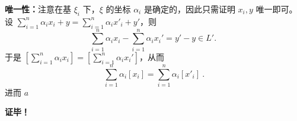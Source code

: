 \textbf{唯一性：}注意在基 $\xi_i$ 下，$\xi$ 的坐标 $\alpha_i$ 是确定的，因此只需证明 $x_i,y$ 唯一即可。设 $\sum\limits_{i=1}^n\alpha_i x_i+y=\sum\limits_{i=1}^n\alpha_i x'_i+y'$，则
\begin{equation}
\sum_{i=1}^n\alpha_i x_i-\sum_{i=1}^n\alpha_i x_i'=y'-y\in L'.~
\end{equation}
于是 $[\sum_{i=1}^n\alpha_i x_i]=[\sum_{i=1}^n\alpha_i x_i']$，从而
\begin{equation}
\sum_{i=1}^n \alpha_i[x_i]=\sum_{i=1}^n \alpha_i[x'_i]~.
\end{equation}
进而 $a$




\textbf{证毕！}

